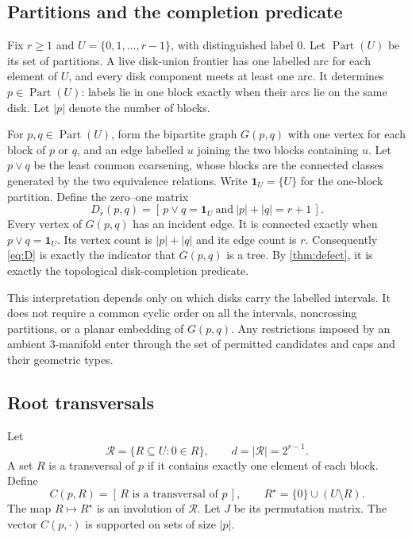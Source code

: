 \documentclass[11pt,a4paper]{article}
\theoremstyle{definition}
\theoremstyle{remark}
\newcommand{\Part}{\operatorname{Part}}
\newcommand{\one}{\boldsymbol{1}}
\newcommand{\ind}[1]{[\,#1\,]}
\begin{document}
\subsection{Partitions and the completion predicate}
Fix $r\ge1$ and $U=\{0,1,\ldots,r-1\}$, with distinguished label $0$.
Let $\Part(U)$ be its set of partitions. A live disk-union frontier has one labelled
arc for each element of $U$, and every disk component meets at least one arc.
It determines $p\in\Part(U)$: labels lie in one block exactly when their arcs lie
on the same disk. Let $|p|$ denote the number of blocks.

For $p,q\in\Part(U)$, form the bipartite graph $G(p,q)$ with one vertex for each
block of $p$ or $q$, and an edge labelled $u$ joining the two blocks containing $u$.
Let $p\vee q$ be the least common coarsening, whose blocks are the connected classes
generated by the two equivalence relations. Write $\one_U=\{U\}$ for the one-block
partition. Define the zero--one matrix
\begin{equation}
 D_r(p,q)=\ind{p\vee q=\one_U\ \text{and}\ |p|+|q|=r+1}.
 \label{eq:D}
\end{equation}
Every vertex of $G(p,q)$ has an incident edge. It is connected exactly when
$p\vee q=\one_U$. Its vertex count is $|p|+|q|$ and its edge count is $r$.
Consequently \eqref{eq:D} is exactly the indicator that $G(p,q)$ is a tree.
By \cref{thm:defect}, it is exactly the topological disk-completion predicate.

This interpretation depends only on which disks carry the labelled intervals. It does
not require a common cyclic order on all the intervals, noncrossing partitions, or a
planar embedding of $G(p,q)$. Any restrictions imposed by an ambient 3-manifold enter
through the set of permitted candidates and caps and their geometric types.

\subsection{Root transversals}
Let
\[
 \mathcal R=\{R\subseteq U:0\in R\},\qquad d=|\mathcal R|=2^{r-1}.
\]
A set $R$ is a transversal of $p$ if it contains exactly one element of each block.
Define
\begin{equation}
 C(p,R)=\ind{R\text{ is a transversal of }p},\qquad
 R^\star=\{0\}\cup(U\setminus R).
 \label{eq:C}
\end{equation}
The map $R\mapsto R^\star$ is an involution of $\mathcal R$. Let $J$ be its
permutation matrix. The vector $C(p,\cdot)$ is supported on sets of size $|p|$.
\end{document}

